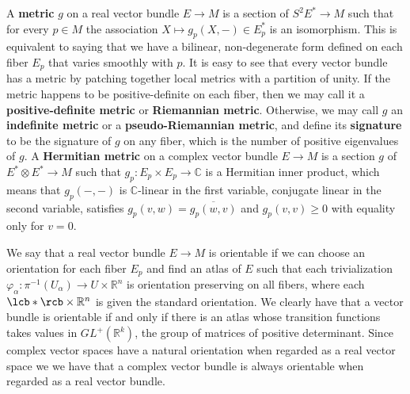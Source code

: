 A \textbf{metric} $g$ on a real vector bundle $E \rightarrow M$ is a section of $S^2 E^* \rightarrow M$ such that for every $p \in M$ the association $X \mapsto g_p(X,-) \in E_p^*$ is an isomorphism. This is equivalent to saying that we have a bilinear, non-degenerate form defined on each fiber $E_p$ that varies smoothly with $p$. It is easy to see that every vector bundle has a metric by patching together local metrics with a partition of unity. If the metric happens to be positive-definite on each fiber, then we may call it a \textbf{positive-definite metric} or \textbf{Riemannian metric}. Otherwise, we may call $g$ an \textbf{indefinite metric} or a \textbf{pseudo-Riemannian metric}, and define its \textbf{signature} to be the signature of $g$ on any fiber, which is the number of positive eigenvalues of $g$. A \textbf{Hermitian metric} on a complex vector bundle $E \rightarrow M$ is a section $g$ of $E^* \otimes E^* \rightarrow M$ such that $g_p : E_p \times E_p \rightarrow \mathbb C$ is a Hermitian inner product, which means that $g_p(-,-)$ is $\mathbb C$-linear in the first variable, conjugate linear in the second variable, satisfies $g_p(v,w) = \overline{g_p(w,v)}$ and $g_p(v,v) \geq 0$ with equality only for $v=0$. 

We say that a real vector bundle $E \rightarrow M$ is orientable if we can choose an orientation for each fiber $E_p$ and find an atlas of $E$ such that each trivialization $\varphi_\alpha : \pi^{-1}(U_\alpha) \rightarrow U \times \mathbb R^n$ is orientation preserving on all fibers, where each $\lcb * \rcb \times \mathbb R^n$ is given the standard orientation. We clearly have that a vector bundle is orientable if and only if there is an atlas whose transition functions takes values in $GL^+(\mathbb R^k)$, the group of matrices of positive determinant. Since complex vector spaces have a natural orientation when regarded as a real vector space we we have that a complex vector bundle is always orientable when regarded as a real vector bundle.

